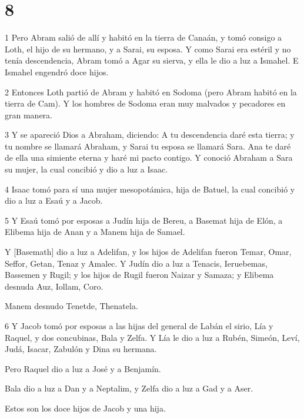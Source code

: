 \chapter{8}

\par 1 Pero Abram salió de allí y habitó en la tierra de Canaán, y tomó consigo a Loth, el hijo de su hermano, y a Sarai, su esposa. Y como Sarai era estéril y no tenía descendencia, Abram tomó a Agar su sierva, y ella le dio a luz a Ismahel. E Ismahel engendró doce hijos.

\par 2 Entonces Loth partió de Abram y habitó en Sodoma (pero Abram habitó en la tierra de Cam). Y los hombres de Sodoma eran muy malvados y pecadores en gran manera.

\par 3 Y se apareció Dios a Abraham, diciendo: A tu descendencia daré esta tierra; y tu nombre se llamará Abraham, y Sarai tu esposa se llamará Sara. Ana te daré de ella una simiente eterna y haré mi pacto contigo. Y conoció Abraham a Sara su mujer, la cual concibió y dio a luz a Isaac.

\par 4 Isaac tomó para sí una mujer mesopotámica, hija de Batuel, la cual concibió y dio a luz a Esaú y a Jacob.

\par 5 Y Esaú tomó por esposas a Judín hija de Bereu, a Basemat hija de Elón, a Elibema hija de Anan y a Manem hija de Samael.

Y [Basemath] dio a luz a Adelifan, y los hijos de Adelifan fueron Temar, Omar, Seffor, Getan, Tenaz y Amalec. Y Judín dio a luz a Tenacis, Ieruebemas, Bassemen y Rugil; y los hijos de Rugil fueron Naizar y Samaza; y Elibema desnuda Auz, Iollam, Coro.

\par Manem desnudo Tenetde, Thenatela.

\par 6 Y Jacob tomó por esposas a las hijas del general de Labán el sirio, Lía y Raquel, y dos concubinas, Bala y Zelfa. Y Lía le dio a luz a Rubén, Simeón, Leví, Judá, Isacar, Zabulón y Dina su hermana.

Pero Raquel dio a luz a José y a Benjamín.

Bala dio a luz a Dan y a Neptalim, y Zelfa dio a luz a Gad y a Aser.

\par Estos son los doce hijos de Jacob y una hija.

